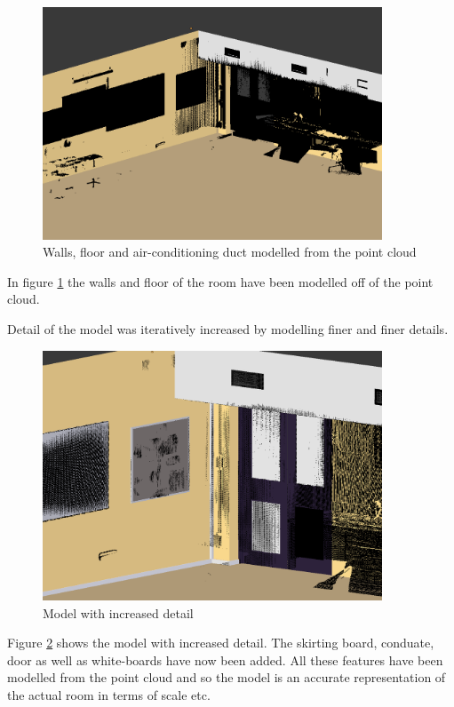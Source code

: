 \documentclass[11pt,a4paper]{report}
\begin{document}
				\begin{figure}[h!]
					\centering
					\includegraphics[width=0.9\textwidth]{simple_model_with_pc}
					\caption{Walls, floor and air-conditioning duct modelled from the point cloud}
					\label{fig:simple_model}
				\end{figure}
				
				In figure \ref{fig:simple_model} the walls and floor of the room have been modelled off of the point cloud. 
				
				Detail of the model was iteratively increased by modelling finer and finer details.
				
				\begin{figure}[h!]
					\centering
					\includegraphics[width=0.9\textwidth]{model_with_increased_detail}
					\caption{Model with increased detail}
					\label{fig:more_complex_model}
				\end{figure}
				
				Figure \ref{fig:more_complex_model} shows the model with increased detail. The skirting board, conduate, door as well as white-boards have now been added. All these features have been modelled from the point cloud and so the model is an accurate representation of the actual room in terms of scale etc.
				
\end{document}

